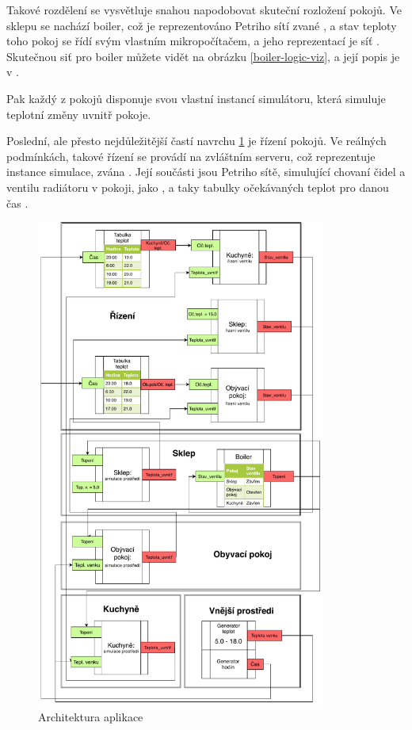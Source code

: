 Takové rozdělení se vysvětluje snahou napodobovat skuteční rozložení pokojů. Ve sklepu se nachází boiler, což je reprezentováno Petriho sítí zvané , a stav teploty toho pokoj se řídí svým vlastním mikropočítačem, a jeho reprezentací je síť . Skutečnou siť pro boiler můžete vidět na obrázku \ref{boiler-logic-viz}, a její popis je v \todo{}.

Pak každý z pokojů disponuje svou vlastní instancí simulátoru, která simuluje teplotní změny uvnitř pokoje.

Poslední, ale přesto nejdůležitější častí navrchu \ref{boiler-net} je řízení pokojů. Ve reálných podmínkách, takové řízení se provádí na zvláštním serveru, což reprezentuje instance simulace, zvána . Její součásti jsou Petriho sítě, simulující chovaní čidel a ventilu radiátoru v pokoji, jako , a taky tabulky očekávaných teplot pro danou čas .

\begin{figure}[htb]
  \centering
  \includegraphics[width=0.85\textwidth]{obrazky-figures/boiler-net.pdf}
  \caption{Architektura aplikace}
  \label{boiler-net}
\end{figure}

